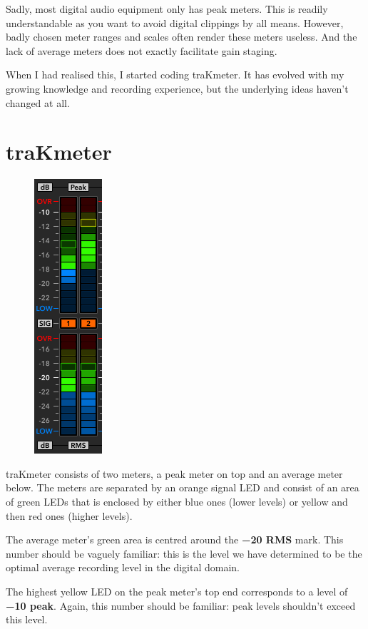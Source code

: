 Sadly, most digital audio equipment only has peak meters.  This is
readily understandable as you want to avoid digital clippings by all
means.  However, badly chosen meter ranges and scales often render
these meters useless.  And the lack of average meters does not exactly
facilitate gain staging.

When I had realised this, I started coding traKmeter.  It has evolved
with my growing knowledge and recording experience, but the underlying
ideas haven't changed at all.

\chapter{traKmeter}
\label{chap:trakmeter}

\begin{figure}
\includegraphics[scale=\screenshotscale,clip]{include/images/level_meter_complete.png}
\end{figure}

traKmeter consists of two meters, a peak meter on top and an average
meter below.  The meters are separated by an orange signal LED and
consist of an area of green LEDs that is enclosed by either blue ones
(lower levels) or yellow and then red ones (higher levels).

The average meter's green area is centred around the
\textbf{\SI{-20}{\dBFS} RMS} mark.  This number should be vaguely
familiar: this is the level we have determined to be the optimal
average recording level in the digital domain.

The highest yellow LED on the peak meter's top end corresponds to a
level of \textbf{\SI{-10}{\dBFS} peak}.  Again, this number should be
familiar: peak levels shouldn't exceed this level.

